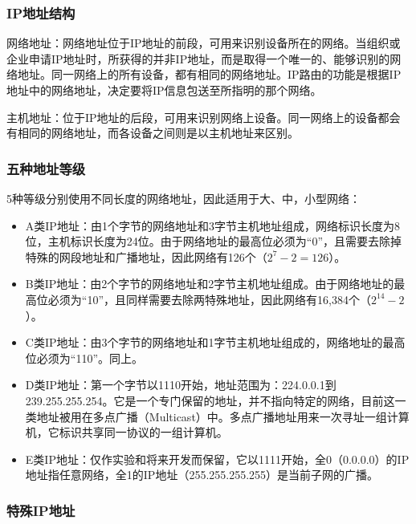 \documentclass[UTF8]{article}%
\begin{document}
\subsubsection{IP地址结构}

网络地址：网络地址位于IP地址的前段，可用来识别设备所在的网络。当组织或企业申请IP地址时，所获得的并非IP地址，而是取得一个唯一的、能够识别的网络地址。同一网络上的所有设备，都有相同的网络地址。IP路由的功能是根据IP地址中的网络地址，决定要将IP信息包送至所指明的那个网络。

主机地址：位于IP地址的后段，可用来识别网络上设备。同一网络上的设备都会有相同的网络地址，而各设备之间则是以主机地址来区别。

\subsubsection{五种地址等级}

5种等级分别使用不同长度的网络地址，因此适用于大、中，小型网络：

\begin{itemize}
    \item A类IP地址：由1个字节的网络地址和3字节主机地址组成，网络标识长度为8位，主机标识长度为24位。由于网络地址的最高位必须为“0”，且需要去除掉特殊的网段地址和广播地址，因此网络有126个（$2^7-2=126$）。
    \item B类IP地址：由2个字节的网络地址和2字节主机地址组成。由于网络地址的最高位必须为“10”，且同样需要去除两特殊地址，因此网络有16,384个（$2^{14}-2$）。
    \item C类IP地址：由3个字节的网络地址和1字节主机地址组成的，网络地址的最高位必须为“110”。同上。
    \item D类IP地址：第一个字节以1110开始，地址范围为：224.0.0.1到239.255.255.254。它是一个专门保留的地址，并不指向特定的网络，目前这一类地址被用在多点广播（Multicast）中。多点广播地址用来一次寻址一组计算机，它标识共享同一协议的一组计算机。
    \item E类IP地址：仅作实验和将来开发而保留，它以1111开始，全0（0.0.0.0）的IP地址指任意网络，全1的IP地址（255.255.255.255）是当前子网的广播。
\end{itemize}

\subsubsection{特殊IP地址}
\end{document}
